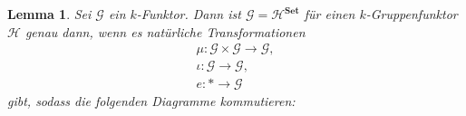 \documentclass[a4paper, 11pt]{scrartcl}
\newcommand{\id}{\text{id}}
\theoremstyle{basicstyle}
\newtheorem{lemma}[definition]{Lemma}
\begin{document}
    \begin{lemma}\label{lem:1}
        Sei \(\mathcal{G}\) ein \(k\)-Funktor.
        Dann ist \(\mathcal{G} = \mathcal{H}^{\textbf{Set}}\) für einen \(k\)-Gruppenfunktor \(\mathcal{H}\) genau dann, wenn es natürliche Transformationen
        \begin{gather*}
            \mu: \mathcal{G} \times \mathcal{G} \longrightarrow \mathcal{G}, \\
            \iota: \mathcal{G} \longrightarrow \mathcal{G}, \\
            e: \ast \longrightarrow \mathcal{G}
        \end{gather*}
        gibt, sodass die folgenden Diagramme kommutieren:
        \begin{figure*}[ht!]
            \centering
        \end{figure*}
        \begin{figure*}[ht!]
            \centering
            \hspace*{4em}
        \end{figure*}
        \begin{figure*}[ht!]
            \centering
            \begin{tikzcd}

\end{tikzcd}
\end{figure*}
\end{lemma}
\end{document}
